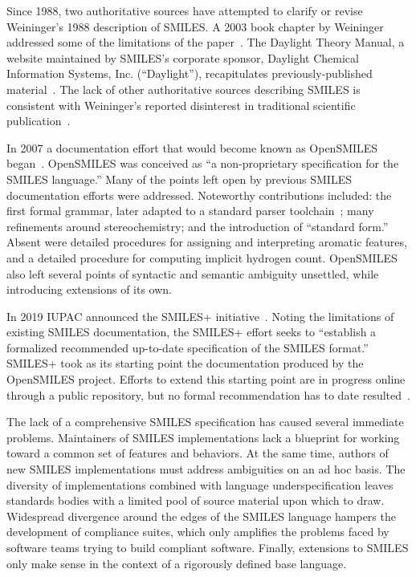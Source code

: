 \documentclass{article}
\begin{document}
Since 1988, two authoritative sources have attempted to clarify or revise Weininger's 1988 description of SMILES. A 2003 book chapter by Weininger addressed some of the limitations of the paper~\cite{weininger:2003}. The Daylight Theory Manual, a website maintained by SMILES's corporate sponsor, Daylight Chemical Information Systems, Inc. (\enquote{Daylight}), recapitulates previously-published material~\cite{daylightTheory}. The lack of other authoritative sources describing SMILES is consistent with Weininger's reported disinterest in traditional scientific publication~\cite{gasteiger:2018}.

In 2007 a documentation effort that would become known as OpenSMILES began~\cite{openSMILES}. OpenSMILES was conceived as \enquote{a non-proprietary specification for the SMILES language.} Many of the points left open by previous SMILES documentation efforts were addressed. Noteworthy contributions included: the first formal grammar, later adapted to a standard parser toolchain~\cite{denjoed:2010}; many refinements around stereochemistry; and the introduction of \enquote{standard form.} Absent were detailed procedures for assigning and interpreting aromatic features, and a detailed procedure for computing implicit hydrogen count. OpenSMILES also left several points of syntactic and semantic ambiguity unsettled, while introducing extensions of its own.

In 2019 IUPAC announced the SMILES+ initiative~\cite{smilesPlusSpecification}. Noting the limitations of existing SMILES documentation, the SMILES+ effort seeks to \enquote{establish a formalized recommended up-to-date specification of the SMILES format.} SMILES+ took as its starting point the documentation produced by the OpenSMILES project. Efforts to extend this starting point are in progress online through a public repository, but no formal recommendation has to date resulted~\cite{smilesPlusGitHub}.

The lack of a comprehensive SMILES specification has caused several immediate problems. Maintainers of SMILES implementations lack a blueprint for working toward a common set of features and behaviors. At the same time, authors of new SMILES implementations must address ambiguities on an ad hoc basis. The diversity of implementations combined with language underspecification leaves standards bodies with a limited pool of source material upon which to draw. Widespread divergence around the edges of the SMILES language hampers the development of compliance suites, which only amplifies the problems faced by software teams trying to build compliant software. Finally, extensions to SMILES only make sense in the context of a rigorously defined base language.
\end{document}
